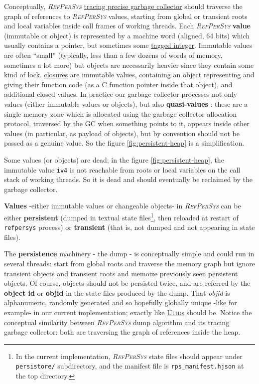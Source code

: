 \documentclass[11pt,a4paper,svgnames]{article}
\newcommand{\RefPerSys}{{\textit{\textsc{RefPerSys}}}}
\begin{document}
Conceptually, {\RefPerSys}
\href{https://en.wikipedia.org/wiki/Tracing_garbage_collection}{tracing
  precise garbage collector} should traverse the graph of references
to {\RefPerSys} values, starting from global or transient roots and
local variables inside call frames of working threads. Each
{\RefPerSys} \textbf{value}  (immutable or object) is
represented by a machine word (aligned, 64 bits) which usually
contains a pointer, but sometimes some
\href{https://en.wikipedia.org/wiki/Tagged\_pointer}{tagged integer}.
Immutable values are often ``small'' (typically, less than a few dozens of words of memory, sometimes a lot more) but
objects are necessarily heavier since they contain some kind of
lock. \href{https://en.wikipedia.org/wiki/Closure\_(computer_programming)}{closures}
are immutable values, containing an object representing and giving
their function code (as a C function pointer inside that object), and
additional closed values. In practice our garbage collector processes
not only values (either immutable values or objects), but also
\textbf{quasi-values} : these are a single memory
zone which is allocated using the garbage collector allocation
protocol, traversed by the GC when something points to it, appears
inside other values (in particular, as payload  of objects), but by
convention should not be passed as a genuine value. So the figure
\ref{fig:persistent-heap} is a simplification.

Some values (or objects) are dead; in the figure
\ref{fig:persistent-heap}, the immutable value \texttt{iv4} is not
reachable from roots or local variables on the call stack of working
threads. So it is dead and should eventually be reclaimed by the
garbage collector.

\textbf{Values} -either immutable values or changeable objects- in
       {\RefPerSys} can be either \textbf{persistent} (dumped in
       textual state files\footnote{In the current implementation,
       {\RefPerSys} state files should appear under
       \texttt{persistore/} subdirectory, and the manifest file is
       \texttt{rps\_manifest.hjson} at the top directory.}, then
       reloaded at restart of \texttt{refpersys} process) or
       \textbf{transient} (that is, not dumped and not appearing in
       state files).

The \textbf{persistence} machinery - the dump - is conceptually simple
and could run in several threads: start from global roots and traverse
the memory graph but ignore transient objects and transient roots and
memoize previously seen persistent objects. Of course, objects should
not be persisted twice, and are referred by the \textbf{object id} or
\textbf{objid} in the state files produced by the dump. That
\textit{objid}  is alphanumeric, randomly generated and so hopefully
globally unique -like {}
for example- in our current implementation; exactly like
\href{https://en.wikipedia.org/wiki/Universally_unique_identifier}{\textsc{Uuid}s}
should be. Notice the conceptual similarity between {\RefPerSys} dump
algorithm and its tracing garbage collector: both are traversing the
graph of references inside the heap.
\end{document}
